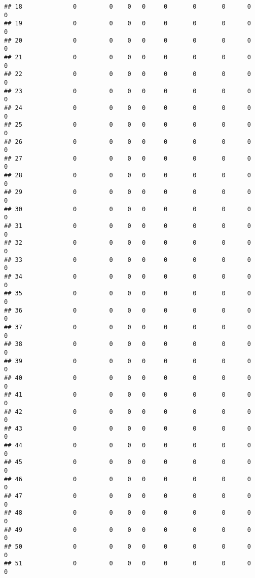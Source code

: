 \documentclass[
]{article}
\begin{document}
\begin{verbatim}
## 18              0         0    0   0     0       0       0      0        0
## 19              0         0    0   0     0       0       0      0        0
## 20              0         0    0   0     0       0       0      0        0
## 21              0         0    0   0     0       0       0      0        0
## 22              0         0    0   0     0       0       0      0        0
## 23              0         0    0   0     0       0       0      0        0
## 24              0         0    0   0     0       0       0      0        0
## 25              0         0    0   0     0       0       0      0        0
## 26              0         0    0   0     0       0       0      0        0
## 27              0         0    0   0     0       0       0      0        0
## 28              0         0    0   0     0       0       0      0        0
## 29              0         0    0   0     0       0       0      0        0
## 30              0         0    0   0     0       0       0      0        0
## 31              0         0    0   0     0       0       0      0        0
## 32              0         0    0   0     0       0       0      0        0
## 33              0         0    0   0     0       0       0      0        0
## 34              0         0    0   0     0       0       0      0        0
## 35              0         0    0   0     0       0       0      0        0
## 36              0         0    0   0     0       0       0      0        0
## 37              0         0    0   0     0       0       0      0        0
## 38              0         0    0   0     0       0       0      0        0
## 39              0         0    0   0     0       0       0      0        0
## 40              0         0    0   0     0       0       0      0        0
## 41              0         0    0   0     0       0       0      0        0
## 42              0         0    0   0     0       0       0      0        0
## 43              0         0    0   0     0       0       0      0        0
## 44              0         0    0   0     0       0       0      0        0
## 45              0         0    0   0     0       0       0      0        0
## 46              0         0    0   0     0       0       0      0        0
## 47              0         0    0   0     0       0       0      0        0
## 48              0         0    0   0     0       0       0      0        0
## 49              0         0    0   0     0       0       0      0        0
## 50              0         0    0   0     0       0       0      0        0
## 51              0         0    0   0     0       0       0      0        0

\end{verbatim}
\end{document}
